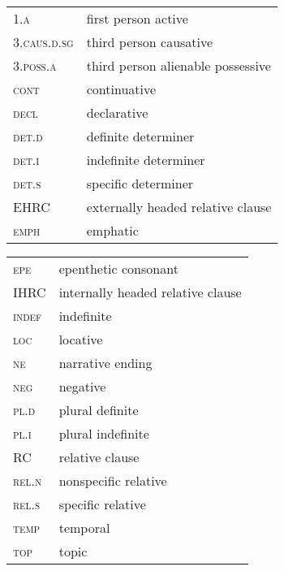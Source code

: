 \documentclass[output=paper]{LSP/langsci}
\begin{document}
\begin{tabularx}{.45\textwidth}{lX}
\textsc{1.a} & first person active \\
\textsc{3.caus.d.sg} & third person causative \\
\textsc{3.poss.a} & third person alienable possessive \\
\textsc{cont} & continuative \\
\textsc{decl} & declarative \\
\textsc{det.d} & definite determiner \\
\textsc{det.i} & indefinite determiner \\
\textsc{det.s} & specific determiner \\
EHRC & externally headed relative clause \\
\textsc{emph} & emphatic \\
\end{tabularx}
\begin{tabularx}{.45\textwidth}{lX}
\textsc{epe} & epenthetic consonant \\
IHRC & internally headed relative clause \\
\textsc{indef} & indefinite \\
\textsc{loc} & locative \\
\textsc{ne} & narrative ending \\
\textsc{neg} & negative \\
\textsc{pl.d} & plural definite \\
\textsc{pl.i} & plural indefinite \\
RC & relative clause \\
\textsc{rel.n} & nonspecific relative \\
\textsc{rel.s} & specific relative \\
\textsc{temp} & temporal \\
\textsc{top} & topic \\
\end{tabularx}


{\sloppy
\printbibliography[heading=subbibliography,notkeyword=this]
}
\end{document}
